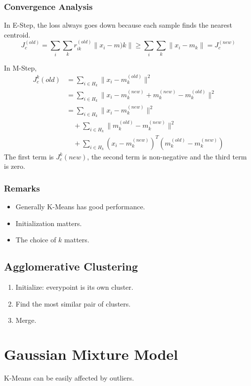\subsubsection{Convergence Analysis}
In E-Step, the loss always goes down because each sample finds the nearest centroid.
\[ J_c^{(old)} = \sum_i\sum_kr_{ik}^{(old)}\|x_i-m)k\| \ge \sum_i\sum_k\|x_i-m_k\| = J_c^{(new)} \]

In M-Step,
\begin{align*}
    J_c^k(old) & = \sum_{i\in H_k}\|x_i - m_k^{(old)}\|^2                               \\
               & = \sum_{i\in H_k}\| x_i - m_k^{(new)} + m_k^{(new)} - m_k^{(old)} \|^2 \\
               & = \sum_{i\in H_k} \|x_i - m_k^{(new)}\|^2                              \\
               & \quad + \sum_{i\in H_k}\|m_k^{(old)} - m_k^{(new)}\|^2                 \\
               & \quad + \sum_{i\in H_k}(x_i-m_k^{(new)})^T(m_k^{(old)}-m_k^{(new)})
\end{align*}
The first term is $J_c^k(new)$, the second term is non-negative and the third term is zero.

\subsubsection{Remarks}
\begin{itemize}
    \item Generally K-Means has good performance.
    \item Initialization matters.
    \item The choice of $k$ matters.
\end{itemize}

\subsection{Agglomerative Clustering}
\begin{enumerate}
    \item Initialize: everypoint is its own cluster.
    \item Find the most similar pair of clusters.
    \item Merge.
\end{enumerate}


\section{Gaussian Mixture Model}
    K-Means can be easily affected by outliers.

